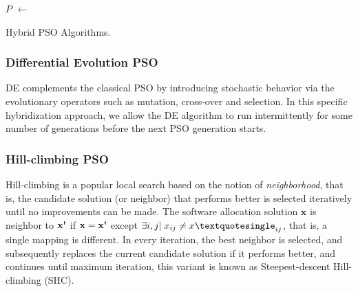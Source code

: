 \IncMargin{1em}
\begin{algorithm}[H]

\BlankLine
{}
\BlankLine
\Particles $P$ $\leftarrow$ \InitPSO{}\;
\BlankLine
 \caption{Hybrid PSO Algorithms.}\label{alg_depso}
\end{algorithm}\DecMargin{1em}
 
\subsubsection{Differential Evolution PSO}
DE complements the classical PSO by introducing stochastic behavior via the evolutionary operators such as mutation, cross-over and selection. In this specific hybridization approach, we allow the DE algorithm to run intermittently for some number of generations before the next PSO generation starts.

\subsubsection{Hill-climbing PSO}
Hill-climbing is a popular local search based on the notion of \textit{neighborhood}, that is, the candidate solution (or neighbor) that performs better is selected iteratively until no improvements can be made. The software allocation solution $\textbf{x}$ is neighbor to $\textbf{x\textquotesingle}$ if $\textbf{x}=\textbf{x\textquotesingle}$ except $\exists i,j|\;x_{ij}\neq x\textquotesingle_{ij}$, that is, a single mapping is different. In every iteration, the best neighbor is selected, and subsequently replaces the current candidate solution if it performs better, and continues until maximum iteration, this variant is known as Steepest-descent Hill-climbing (SHC).

